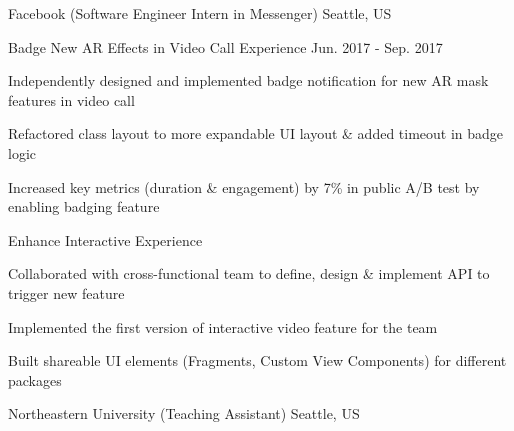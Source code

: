 

\begin{cventries}

  \cventry
    {} %
    {Facebook (Software Engineer Intern in Messenger)} %
    {Seattle, US} %
    {} %
    {}

  \vspace{-10mm}
  \cventry
    {Badge New AR Effects in Video Call Experience} %
    {}  %
    {}  %
    {Jun. 2017 - Sep. 2017} %
    {
      \begin{cvitems} %
        \item {Independently designed and implemented badge notification for new AR mask features in video call}
        \item {Refactored class layout to more expandable UI layout \& added timeout in badge logic}
        \item {Increased key metrics (duration \& engagement) by 7\% in public A/B test by enabling badging feature}
      \end{cvitems}
    }

  \vspace{-2mm}
  \cventry
    {Enhance Interactive Experience} %
    {}  %
    {}  %
    {} %
    {
      \begin{cvitems} %
        \item {Collaborated with cross-functional team to define, design \& implement API to trigger new feature}
        \item {Implemented the first version of interactive video feature for the team}
        \item {Built shareable UI elements (Fragments, Custom View Components) for different packages}
      \end{cvitems}
    }

  \cventry
    {} %
    {Northeastern University (Teaching Assistant)} %
    {Seattle, US} %
    {} %
    {}


\end{cventries}

